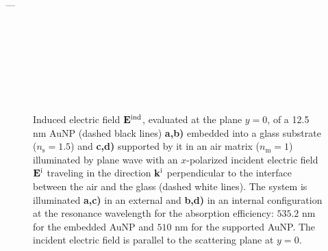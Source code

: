 ---
\begin{figure}[t!]\centering
   \def\svgwidth{.75\textwidth}
   \footnotesize
   \\[-47.5em]
   \hspace*{-.25\textwidth}
       \begin{subfigure}{.25\textwidth}\textcolor{red}{\caption{ } \label{sfig:Near:IncNorm:50:par}}\end{subfigure}%
       \begin{subfigure}{.34\textwidth}\caption{ }\label{sfig:Near:IncNorm:50:perp}\end{subfigure}\\[13em]
    \hspace*{-.25\textwidth}
        \begin{subfigure}{.25\textwidth}\textcolor{red}{\caption{ }\label{sfig:Near:IncNorm:00:par}}\end{subfigure}%
        \begin{subfigure}{.34\textwidth}\caption{ }\label{sfig:Near:IncNorm:00:perp}\end{subfigure}\\[13em]
   \hspace*{-.25\textwidth}
       \begin{subfigure}{.25\textwidth}\caption{ } \label{sfig:Near:IncNorm:-5:par}\end{subfigure}%
       \begin{subfigure}{.34\textwidth}\caption{ }\label{sfig:Near:IncNorm:-5:perp}\end{subfigure}\\[15em]
   \caption[Induced Electric Field of a 12.5 nm Au Spherical NP embbeded into (supported by) a substrate illuminated at a normal incidence]{Induced electric field $\vb{E}^\text{ind}$, evaluated at the plane $y = 0$, of a 12.5 nm AuNP (dashed black lines) \textbf{a,b)} embedded into a glass substrate ($n_\text{s} = 1.5$) and \textbf{c,d)} supported by it in an air matrix ($n_\text{m} = 1$) illuminated by plane wave with an $x$-polarized incident electric field $\vb{E}^\text{i}$ traveling in the direction $\vb{k}^\text{i}$ perpendicular to the interface between the air and the glass (dashed white lines). The system is illuminated \textbf{a,c)}  in an external and \textbf{b,d)} in an internal configuration at the resonance  wavelength for the absorption efficiency: $535.2$ nm for the embedded AuNP and $510$ nm for the supported AuNP. The incident electric field is parallel to the scattering plane at $y=0$.
   }
   \label{fig:Near:IncNorm}
 \end{figure}
